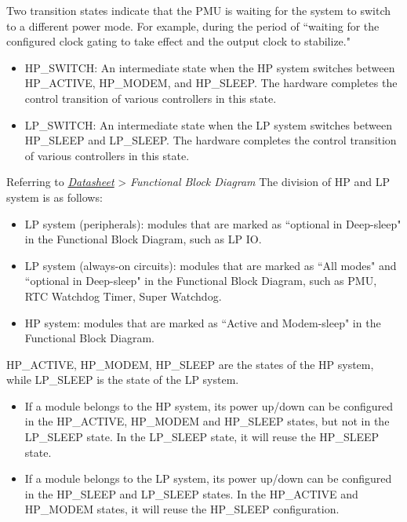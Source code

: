 \documentclass[main\_\_EN.tex]{subfiles}
\begin{document}
Two transition states indicate that the PMU is waiting for the system to switch to a different power mode. For example, during the period of ``waiting for the configured clock gating to take effect and the output clock to stabilize."

\begin{itemize}
    \item HP\_SWITCH: An intermediate state when the HP system switches between HP\_ACTIVE, HP\_MODEM, and HP\_SLEEP. The hardware completes the control transition of various controllers in this state.
    \item LP\_SWITCH: An intermediate state when the LP system switches between HP\_SLEEP and LP\_SLEEP. The hardware completes the control transition of various controllers in this state.
\end{itemize}

\begin{tiplisting}
    Referring to \textit{\href{https://www.espressif.com/sites/default/files/documentation/esp32-c61_datasheet_cn.pdf}{\chipname{} Datasheet}} > \textit{Functional Block Diagram}
    The division of HP and LP system is as follows:
    \begin{itemize}
    \item LP system (peripherals): modules that are marked as ``optional in Deep-sleep" in the Functional Block Diagram, such as LP IO.
    \item LP system (always-on circuits): modules that are marked as ``All modes" and ``optional in Deep-sleep" in the Functional Block Diagram, such as PMU, RTC Watchdog Timer, Super Watchdog.
    \item HP system: modules that are marked as ``Active and Modem-sleep" in the Functional Block Diagram.
    \end{itemize}
\end{tiplisting}

HP\_ACTIVE, HP\_MODEM, HP\_SLEEP are the states of the HP system, while LP\_SLEEP is the state of the LP system.

\begin{itemize}
    \item If a module belongs to the HP system, its power up/down can be configured in the HP\_ACTIVE, HP\_MODEM and HP\_SLEEP states, but not in the LP\_SLEEP state. In the LP\_SLEEP state, it will reuse the HP\_SLEEP state.
    \item If a module belongs to the LP system, its power up/down can be configured in the HP\_SLEEP and LP\_SLEEP states. In the HP\_ACTIVE and HP\_MODEM states, it will reuse the HP\_SLEEP configuration.
\end{itemize}
\end{document}
